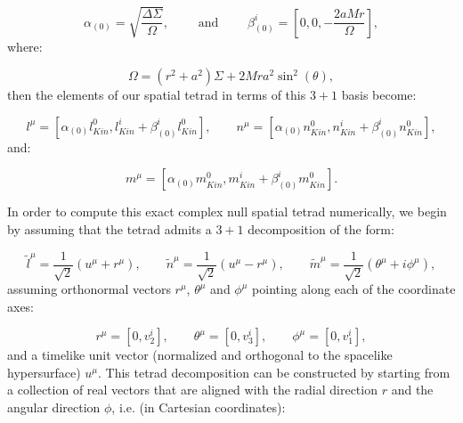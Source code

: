 \documentclass{article}
\begin{document}
\begin{equation}
\alpha_{\left( 0 \right)} = \sqrt{\frac{\Delta \Sigma}{\Omega}}, \qquad \text{ and } \qquad \beta_{\left( 0 \right)}^{i} = \left[ 0, 0, - \frac{2 a M r}{\Omega} \right],
\end{equation}
where:

\begin{equation}
\Omega = \left( r^2 + a^2 \right) \Sigma + 2 M r a^2 \sin^2 \left( \theta \right),
\end{equation}
then the elements of our spatial tetrad in terms of this ${3 + 1}$ basis become:

\begin{equation}
l^{\mu} = \left[ \alpha_{\left( 0 \right)} l_{Kin}^{0}, l_{Kin}^{i} + \beta_{\left( 0 \right)}^{i} l_{Kin}^{0} \right], \qquad n^{\mu} = \left[ \alpha_{\left( 0 \right)} n_{Kin}^{0}, n_{Kin}^{i} + \beta_{\left( 0 \right)}^{i} n_{Kin}^{0} \right],
\end{equation}
and:

\begin{equation}
m^{\mu} = \left[ \alpha_{\left( 0 \right)} m_{Kin}^{0}, m_{Kin}^{i} + \beta_{\left( 0 \right)}^{i} m_{Kin}^{0} \right].
\end{equation}

In order to compute this exact complex null spatial tetrad numerically, we begin by assuming that the tetrad admits a ${3 + 1}$ decomposition of the form:

\begin{equation}
\tilde{l}^{\mu} = \frac{1}{\sqrt{2}} \left( u^{\mu} + r^{\mu} \right), \qquad \tilde{n}^{\mu} = \frac{1}{\sqrt{2}} \left( u^{\mu} - r^{\mu} \right), \qquad \tilde{m}^{\mu} = \frac{1}{\sqrt{2}} \left( \theta^{\mu} + i \phi^{\mu} \right),
\end{equation}
assuming orthonormal vectors ${r^{\mu}}$, ${\theta^{\mu}}$ and ${\phi^{\mu}}$ pointing along each of the coordinate axes:

\begin{equation}
r^{\mu} = \left[ 0, v_{2}^{i} \right], \qquad \theta^{\mu} = \left[ 0, v_{3}^{i} \right], \qquad \phi^{\mu} = \left[ 0, v_{1}^{i} \right],
\end{equation}
and a timelike unit vector (normalized and orthogonal to the spacelike hypersurface) ${u^{\mu}}$. This tetrad decomposition can be constructed by starting from a collection of real vectors that are aligned with the radial direction $r$ and the angular direction ${\phi}$, i.e. (in Cartesian coordinates):
\end{document}

